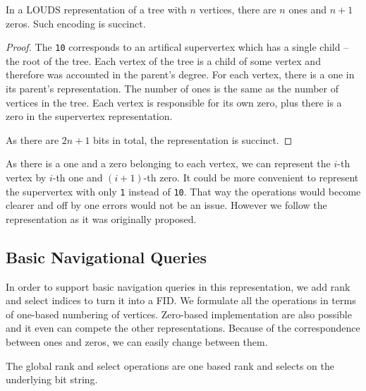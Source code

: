 \begin{lemma}
	In a LOUDS representation of a tree with $n$ vertices, there are $n$ ones and $n+1$ zeros.
	Such encoding is succinct.
\end{lemma}
\begin{proof}
	The \verb|10| corresponds to an artifical supervertex which has a single child -- the root of the tree.
	Each vertex of the tree is a child of some vertex and therefore was accounted in the parent's degree.
	For each vertex, there is a one in its parent's representation.
	The number of ones is the same as the number of vertices in the tree.
	Each vertex is responsible for its own zero, plus there is a zero in the supervertex representation.
	
	As there are $2n+1$ bits in total, the representation is succinct.
\end{proof}

As there is a one and a zero belonging to each vertex, we can represent the $i$-th vertex by $i$-th one and $(i+1)$-th zero.
It could be more convenient to represent the supervertex with only \verb|1| instead of \verb|10|.
That way the operations would become clearer and off by one errors would not be an issue.
However we follow the representation as it was originally proposed.

\subsection{Basic Navigational Queries}

In order to support basic navigation queries in this representation, we add rank and select indices to turn it into a FID.
We formulate all the operations in terms of one-based numbering of vertices.
Zero-based implementation are also possible  and it even can compete the other representations.
Because of the correspondence between ones and zeros, we can easily change between them.

\begin{algorithmic}
	\State {}
\EndFunction
\end{algorithmic}

\begin{algorithmic}
	\State {}
\EndFunction
\end{algorithmic}

The global rank and select operations are one based rank and selects on the underlying bit string.

